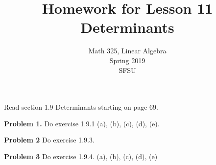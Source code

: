 \documentclass[oneside,12pt]{amsart}
\begin{document}
\title{Homework for Lesson 11 \\ Determinants}
\author{Math 325, Linear Algebra \\ Spring 2019\\ SFSU }
\date{}

\maketitle

Read section 1.9 Determinants starting on page 69.

\bigskip

\textbf{Problem 1.} Do exercise 1.9.1 (a), (b), (c), (d), (e).

\bigskip

\textbf{Problem 2} Do exercise 1.9.3.

\bigskip

\textbf{Problem 3} Do exercise 1.9.4. (a), (b), (c), (d), (e)
\end{document}
